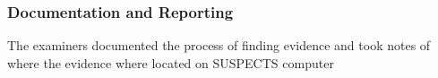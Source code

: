 \subsubsection{Documentation and Reporting}

The examiners documented the process of finding evidence and took notes of where the evidence where located on SUSPECTS computer


